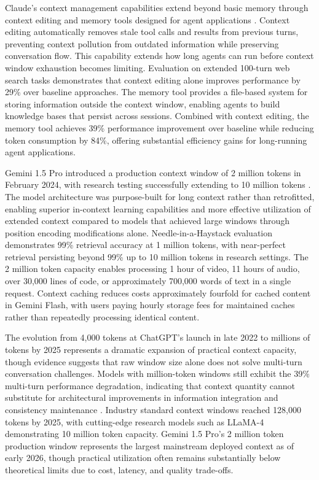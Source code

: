 Claude's context management capabilities extend beyond basic memory through context editing and memory tools designed for agent applications \citep{anthropic2024context}. Context editing automatically removes stale tool calls and results from previous turns, preventing context pollution from outdated information while preserving conversation flow. This capability extends how long agents can run before context window exhaustion becomes limiting. Evaluation on extended 100-turn web search tasks demonstrates that context editing alone improves performance by 29\% over baseline approaches. The memory tool provides a file-based system for storing information outside the context window, enabling agents to build knowledge bases that persist across sessions. Combined with context editing, the memory tool achieves 39\% performance improvement over baseline while reducing token consumption by 84\%, offering substantial efficiency gains for long-running agent applications.

Gemini 1.5 Pro introduced a production context window of 2 million tokens in February 2024, with research testing successfully extending to 10 million tokens \citep{google2024gemini}. The model architecture was purpose-built for long context rather than retrofitted, enabling superior in-context learning capabilities and more effective utilization of extended context compared to models that achieved large windows through position encoding modifications alone. Needle-in-a-Haystack evaluation demonstrates 99\% retrieval accuracy at 1 million tokens, with near-perfect retrieval persisting beyond 99\% up to 10 million tokens in research settings. The 2 million token capacity enables processing 1 hour of video, 11 hours of audio, over 30,000 lines of code, or approximately 700,000 words of text in a single request. Context caching reduces costs approximately fourfold for cached content in Gemini Flash, with users paying hourly storage fees for maintained caches rather than repeatedly processing identical content.

The evolution from 4,000 tokens at ChatGPT's launch in late 2022 to millions of tokens by 2025 represents a dramatic expansion of practical context capacity, though evidence suggests that raw window size alone does not solve multi-turn conversation challenges. Models with million-token windows still exhibit the 39\% multi-turn performance degradation, indicating that context quantity cannot substitute for architectural improvements in information integration and consistency maintenance \citep{wang2025survey}. Industry standard context windows reached 128,000 tokens by 2025, with cutting-edge research models such as LLaMA-4 demonstrating 10 million token capacity. Gemini 1.5 Pro's 2 million token production window represents the largest mainstream deployed context as of early 2026, though practical utilization often remains substantially below theoretical limits due to cost, latency, and quality trade-offs.

